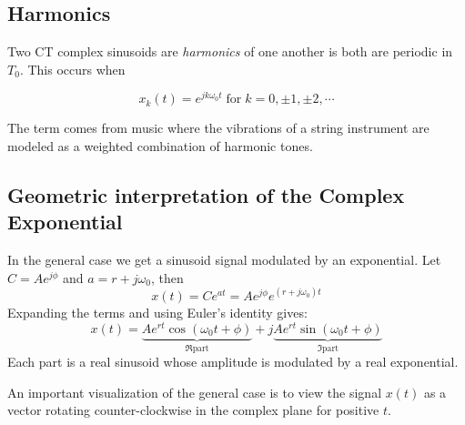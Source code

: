 \subsection{Harmonics}

Two CT complex sinusoids are {\it harmonics} of one another is both are periodic in $T_0$. This occurs when

\[
    x_k(t) = e^{jk\omega_0 t} \; \text{for} \; k = 0, \pm 1, \pm 2, \cdots
\]

The term comes from music where the vibrations of a string instrument are modeled as a weighted combination of harmonic tones. 

\subsection{Geometric interpretation of the Complex Exponential}

In the general case we get a sinusoid signal modulated by an exponential. Let $C = Ae^{j\phi}$ and $a = r + j\omega_0$, then
\[
  x(t) = C e^{a t} =  Ae^{j\phi} e^{(r+j\omega_0)t}
\]
Expanding the terms and using Euler's identity gives:
\[
x(t) = \underbrace{Ae^{rt}\cos(\omega_0 t+\phi)}_{\Re \text{part}} + j \underbrace{Ae^{rt}\sin(\omega_0 t+\phi)}_{\Im \text{part}}
\]
Each part is a real sinusoid whose amplitude is modulated by a real exponential.

An important visualization of the general case is to view the signal $x(t)$ as a vector rotating counter-clockwise in the complex plane for positive $t$.

